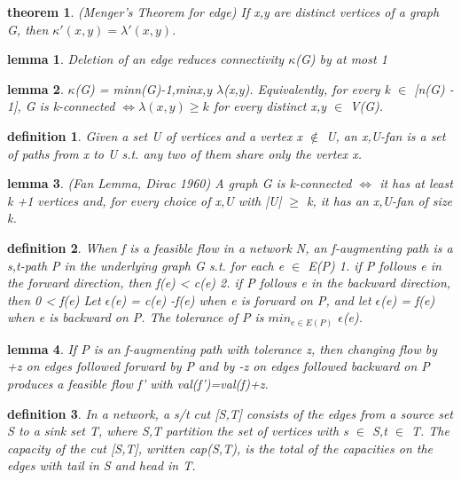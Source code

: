 \documentclass[twocolumn]{article}
\newtheorem{theorem}{theorem}[section]  %
\newtheorem{definition}{definition}
\newtheorem{lemma}{lemma}
\begin{document}
\begin{CJK*}{UTF8}{bkai}
    \begin{theorem}{(Menger's Theorem for edge)}
         If x,y are distinct vertices of a graph G, then $\kappa'(x,y) = \lambda'(x,y)$.
    \end{theorem}

    \begin{lemma}
         Deletion of an edge reduces connectivity $\kappa$(G) by at most 1
    \end{lemma}

    \begin{lemma}
        $\kappa$(G) = min{n(G)-1,minx,y $\lambda$(x,y)}. Equivalently, for every k $\in$ [n(G) - 1],
 G is k-connected $\iff \lambda(x,y) \geq k$ for every distinct x,y $\in$ V(G).
    \end{lemma}

    \begin{definition}
        Given a set U of vertices and a vertex x $\notin $ U, an x,U-fan is a set of paths from
 x to U s.t. any two of them share only the vertex x.
    \end{definition}

    \begin{lemma}{(Fan Lemma, Dirac 1960)}
        A graph G is k-connected $\iff$ it has at least k +1 vertices and, for every choice
 of x,U with |U| $\geq$ k, it has an x,U-fan of size k.
    \end{lemma}

    \begin{definition}
        When f is a feasible flow in a network N, an f-augmenting path is a s,t-path
 P in the underlying graph G s.t. for each e $\in$ E(P)
 1. if P follows e in the forward direction, then f(e) < c(e)
 2. if P follows e in the backward direction, then 0 < f(e)
 Let $\epsilon$(e) = c(e) -f(e) when e is forward on P, and let $\epsilon$(e) = f(e) when e is
 backward on P. The tolerance of P is $min_{e \in E(P)}$ $\epsilon$(e). 
    \end{definition}

    \begin{lemma}
         If P is an f-augmenting path with tolerance z, then changing flow by +z on
 edges followed forward by P and by -z on edges followed backward on P
 produces a feasible flow f' with val(f')=val(f)+z.
    \end{lemma}

    \begin{definition}
        In a network, a s/t cut [S,T] consists of the edges from a source set S to a
 sink set T, where S,T partition the set of vertices with s $\in$ S,t $\in$ T. The
 capacity of the cut [S,T], written cap(S,T), is the total of the capacities on
 the edges with tail in S and head in T. 
    \end{definition}


\end{CJK*}
\end{document}
